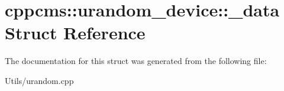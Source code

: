 \hypertarget{structcppcms_1_1urandom__device_1_1__data}{\section{cppcms\-:\-:urandom\-\_\-device\-:\-:\-\_\-data Struct Reference}
\label{structcppcms_1_1urandom__device_1_1__data}
}


The documentation for this struct was generated from the following file\-:\begin{DoxyCompactItemize}
\item 
Utils/urandom.\-cpp\end{DoxyCompactItemize}
